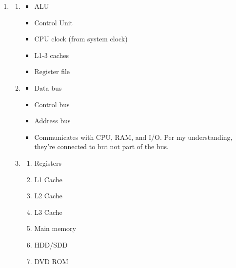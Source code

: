 \documentclass{article}
\begin{document}
\begin{enumerate}
	\item

	      \begin{enumerate}
		      \item
		            \begin{itemize}
			            \item ALU
			            \item Control Unit
			            \item CPU clock (from system clock)
			            \item L1-3 caches
			            \item Register file
		            \end{itemize}
		      \item
		            \begin{itemize}
			            \item Data bus
			            \item Control bus
			            \item Address bus
			            \item Communicates with CPU, RAM, and I/O. Per my
			                  understanding, they're connected to but not part
			                  of the bus.
		            \end{itemize}
		      \item
		            \begin{enumerate}
			            \item Registers
			            \item L1 Cache
			            \item L2 Cache
			            \item L3 Cache
			            \item Main memory
			            \item HDD/SDD
			            \item DVD ROM
		            \end{enumerate}
	      \end{enumerate}
\end{enumerate}
\end{document}
